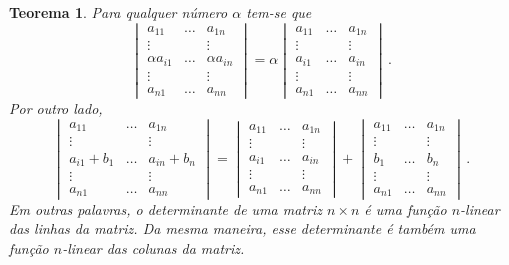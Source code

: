 \documentclass[12pt,a4paper]{report}
\newtheorem{thm}{Teorema}[chapter]
\begin{document}
\begin{thm}
  \label{det.lin}
  Para qualquer número $\alpha$ tem-se que
  $$\begin{vmatrix}
    a_{11}&\ldots& a_{1n}\\
    \vdots&&\vdots\\
    \alpha a_{i1}&\ldots&\alpha a_{in}\\
    \vdots&&\vdots\\
    a_{n1}&\ldots&a_{nn}
  \end{vmatrix}=\alpha\begin{vmatrix}
    a_{11}&\ldots& a_{1n}\\
    \vdots&&\vdots\\
    a_{i1}&\ldots& a_{in}\\
    \vdots&&\vdots\\
    a_{n1}&\ldots&a_{nn}
  \end{vmatrix}\,.$$
  Por outro lado,
  $$\begin{vmatrix}
    a_{11}&\ldots& a_{1n}\\
    \vdots&&\vdots\\
    a_{i1}+b_1&\ldots&a_{in}+b_n\\
    \vdots&&\vdots\\
    a_{n1}&\ldots&a_{nn}
  \end{vmatrix}=\begin{vmatrix}
    a_{11}&\ldots& a_{1n}\\
    \vdots&&\vdots\\
    a_{i1}&\ldots& a_{in}\\
    \vdots&&\vdots\\
    a_{n1}&\ldots&a_{nn}
  \end{vmatrix}+\begin{vmatrix}
    a_{11}&\ldots& a_{1n}\\
    \vdots&&\vdots\\
    b_1&\ldots& b_n\\
    \vdots&&\vdots\\
    a_{n1}&\ldots&a_{nn}
  \end{vmatrix}\,.$$
  Em outras palavras, o determinante de uma matriz $n\times n$ é uma função $n$-linear das linhas da matriz. Da mesma maneira, esse determinante é também uma função $n$-linear das colunas da matriz.
\end{thm}
\end{document}
